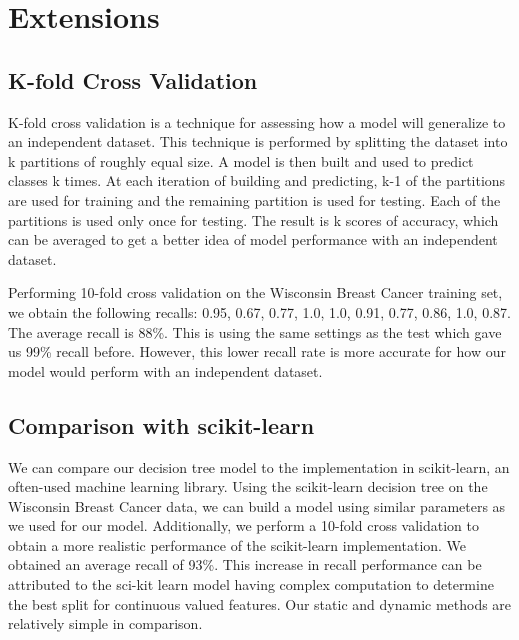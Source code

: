 \documentclass[12pt, conference, compsocconf]{IEEEtran}
\begin{document}
\section{Extensions}

\subsection{K-fold Cross Validation}
K-fold cross validation is a technique for assessing how a model will
generalize to an independent dataset.  This technique is performed by splitting
the dataset into k partitions of roughly equal size.  A model is then built and
used to predict classes k times.  At each iteration of building and predicting,
k-1 of the partitions are used for training and the remaining partition is used
for testing.  Each of the partitions is used only once for testing.  The result
is k scores of accuracy, which can be averaged to get a better idea of model
performance with an independent dataset.

Performing 10-fold cross validation on the Wisconsin Breast Cancer training
set, we obtain the following recalls: 0.95, 0.67, 0.77, 1.0, 1.0, 0.91, 0.77,
0.86, 1.0, 0.87.  The average recall is 88\%.  This is using the same settings
as the test which gave us 99\% recall before.  However, this lower recall rate
is more accurate for how our model would perform with an independent dataset.

\subsection{Comparison with scikit-learn}
We can compare our decision tree model to the implementation in scikit-learn,
an often-used machine learning library.  Using the scikit-learn decision tree
on the Wisconsin Breast Cancer data, we can build a model using similar
parameters as we used for our model.  Additionally, we perform a 10-fold cross
validation to obtain a more realistic performance of the scikit-learn
implementation.  We obtained an average recall of 93\%.  This increase in
recall performance can be attributed to the sci-kit learn model having complex
computation to determine the best split for continuous valued features.  Our
static and dynamic methods are relatively simple in comparison.
\end{document}
